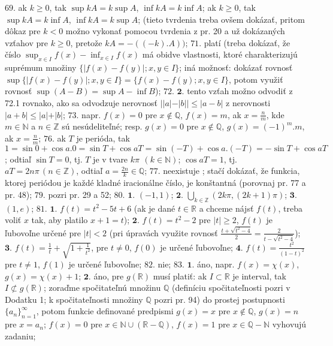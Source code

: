 $\boxed{69.}$ 
ak $ k\geq 0 $, tak $ \sup kA = k \sup A $, $ \inf kA = k \inf A $; ak $ k\geq 0 $, tak $ \sup kA = k \inf A $, $ \inf kA = k \sup A $; (tieto tvrdenia treba ovšem dokázať, pritom dôkaz pre $ k<0 $ možno vykonať pomocou tvrdenia z pr. 20 a už dokázaných vzťahov pre $ k\geq 0 $, pretože $ kA = -((-k).A)) $;
$\boxed{71.}$
platí (treba dokázať, že číslo $ \sup _{x\in I} f(x) - \inf _{x\in I} f(x)  $ má obidve vlastnosti, ktoré charakterizujú suprémum množiny $ \lbrace \vert f(x)-f(y)\vert ;x,y \in I\rbrace $; iná možnosť: dokázať rovnosť $ \sup \lbrace \vert f(x)-f(y)\vert ;x,y \in I\rbrace =  \lbrace f(x)-f(y) ;x,y \in I\rbrace $, potom využiť rovnosť $ \sup (A-B) = \sup A - \inf B $);
$\boxed{72.}$
$\boldsymbol{2.}$
tento vzťah možno odvodiť z 72.1 rovnako, ako sa odvodzuje nerovnosť $ \vert \vert a \vert - \vert b \vert\vert \leq \vert a-b \vert $ z nerovnosti $ \vert a+b \vert \leq \vert a \vert + \vert b \vert $;
$\boxed{73.}$
napr. $ f(x) = 0 $ pre $ x \notin \mathbb{Q} $, $ f(x) = m $, ak $ x=\frac{n}{m} $, kde $ m \in \mathbb{N} $ a $ n \in \mathbb{Z} $ sú nesúdeliteľné; resp. $ g(x)=0 $ pre $ x \notin \mathbb{Q} $, $ g(x)=(-1)^{m}.m $, ak $ x= \frac{n}{m} $;
$\boxed{76.}$
ak $ T $ je perióda, tak $ 1= \sin 0 + \cos a.0 = \sin T + \cos aT = \sin (-T) + \cos a.(-T) = -\sin T + \cos aT $; odtiaľ $ \sin T = 0 $, tj. $ T $  je v tvare $ k \pi\ \,(k \in \mathbb{N})$; $ \cos aT = 1$, tj. $ aT = 2n \pi \, (n \in \mathbb{Z}) $, odtiaľ $ a=\frac{2n}{k} \in \mathbb{Q} $;
$\boxed{77.}$
neexistuje ; stačí dokázať, že funkcia, ktorej periódou je každé kladné iracionálne číslo, je konštantná (porovnaj pr. 77 a pr. 48);
$\boxed{79.}$
pozri pr. 29 a 52;
$\boxed{80.}$
$\boldsymbol{1.}$
$ (-1,1) $;
$\boldsymbol{2.}$
$ \bigcup\limits_{k \in \mathbb{Z}} (2k \pi , (2k+1)\pi) $;
$\boldsymbol{3.}$
$ (1,e) $;
$\boxed{81.}$
$\boldsymbol{1.}$
$ f(t) = t^{2} -5t+6 $ (ak je  dané $ t \in \mathbb{R} $ a chceme nájsť $ f(t) $, treba voliť $ x $ tak, aby platilo $ x+1=t $);
$\boldsymbol{2.}$
$ f(t)=t^{2}-2 $ pre $ \vert t \vert \geq 2 $, $ f(t) $ je ľubovoľne určené pre $ \vert t \vert < 2 $ (pri úpravách využite rovnosť  $ \frac{t+ \sqrt{t^{2}-4}}{2}= \frac{2}{t - \sqrt{t^{2}-4}}$);
$\boldsymbol{3.}$
$ f(t)=\frac{1}{t}+ \sqrt{1+ \frac{1}{t^{2}}}$,  pre  $t\ne 0$, $ f(0) $ je určené ľubovoľne;
$\boldsymbol{4.}$
$ f(t)=\frac{t^{2}}{(1-t)^{2}} $ pre $ t \ne 1 $, $ f(1) $ je určené ľubovoľne;
$\boxed{82.}$
nie;
$\boxed{83.}$
$\boldsymbol{1.}$
áno, napr. $ f(x) = \chi (x) $, $ g(x) = \chi (x)+1 $;
$\boldsymbol{2.}$
áno, pre $ g(\mathbb{R}) $ musí platiť: ak $ I \subset \mathbb{R} $ je interval, tak $ I\not\subset g(\mathbb{R} ) $; zoraďme spočitateľnú množinu $ \mathbb{Q} $ (definíciu spočitateľnosti pozri v Dodatku 1; k spočitateľnosti  množiny $ \mathbb{Q} $ pozri pr. 94) do prostej postupnosti $ \lbrace a _{n}\rbrace_{n=1}^\infty  $, potom funkcie definované predpismi $ g(x)=x $ pre $ x \notin \mathbb{Q} $, $ g(x)=n $ pre $ x=a_{n} $; $ f(x)=0 $ pre $ x \in \mathbb{N} \cup (\mathbb{R}-\mathbb{Q}) $, $ f(x)=1 $ pre $x \in \mathbb{Q} - \mathbb{N} $ vyhovujú zadaniu;
